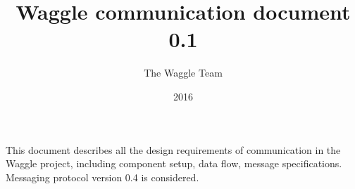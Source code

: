 \documentclass[11pt,letter]{article}
\begin{document}
\title{Waggle communication document 0.1}
\author{The Waggle Team}
\date{2016}
\maketitle
\noindent
This document describes all the design requirements of communication in the Waggle project, including component setup, data flow, message specifications. 
Messaging protocol version 0.4 is considered.




\end{document}
